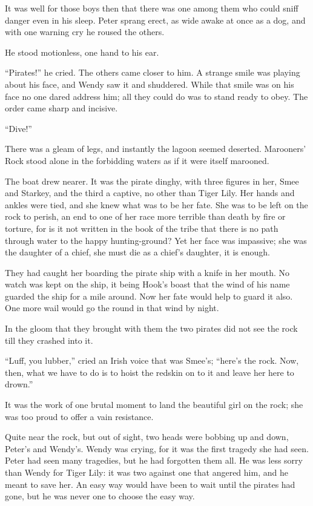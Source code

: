 It was well for those boys then that there was one among them who could sniff danger even in his sleep.
Peter sprang erect, as wide awake at once as a dog, and with one warning cry he roused the others.

He stood motionless, one hand to his ear.

“Pirates!\@” he cried.
The others came closer to him.
A strange smile was playing about his face, and Wendy saw it and shuddered.
While that smile was on his face no one dared address him;
all they could do was to stand ready to obey.
The order came sharp and incisive.

“Dive!”

There was a gleam of legs, and instantly the lagoon seemed deserted.
Marooners’ Rock stood alone in the forbidding waters as if it were itself marooned.

The boat drew nearer.
It was the pirate dinghy, with three figures in her,
Smee and Starkey, and the third a captive, no other than Tiger Lily.
Her hands and ankles were tied, and she knew what was to be her fate.
She was to be left on the rock to perish,
an end to one of her race more terrible than death by fire or torture,
for is it not written in the book of the tribe that there is no path through water to the happy hunting-ground?
Yet her face was impassive;
she was the daughter of a chief, she must die as a chief’s daughter, it is enough.

They had caught her boarding the pirate ship with a knife in her mouth.
No watch was kept on the ship, it being Hook’s boast that the wind of his name guarded the ship for a mile around.
Now her fate would help to guard it also.
One more wail would go the round in that wind by night.

In the gloom that they brought with them the two pirates did not see the rock till they crashed into it.

“Luff, you lubber,” cried an Irish voice that was Smee’s;
“here’s the rock.
Now, then, what we have to do is to hoist the redskin on to it and leave her here to drown.”

It was the work of one brutal moment to land the beautiful girl on the rock;
she was too proud to offer a vain resistance.

Quite near the rock, but out of sight, two heads were bobbing up and down, Peter’s and Wendy’s.
Wendy was crying, for it was the first tragedy she had seen.
Peter had seen many tragedies, but he had forgotten them all.
He was less sorry than Wendy for Tiger Lily:
it was two against one that angered him, and he meant to save her.
An easy way would have been to wait until the pirates had gone,
but he was never one to choose the easy way.

